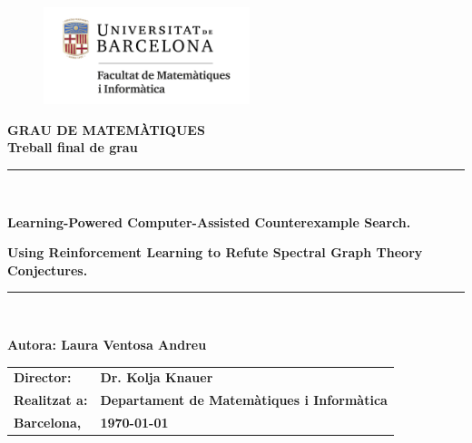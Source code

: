 \documentclass[11pt]{article}
\title{}
\author{}
\date{}
\theoremstyle{definition}
\begin{document}
\begin{titlepage}
\begin{center}
\begin{figure}[htb]
\begin{center}
\includegraphics[width=6cm]{matematiquesinformatica-pos-rgb.png}
\end{center}
\end{figure}
\vspace*{1cm}

\textbf{\LARGE GRAU DE MATEM\`{A}TIQUES } \\
\vspace*{.5cm}
\textbf{\LARGE Treball final de grau} \\
\vspace*{1.5cm}

\rule{16cm}{0.1mm} \\
\begin{Huge}
\textbf{Learning-Powered Computer-Assisted Counterexample Search.} \\
\end{Huge}
\vspace*{.5cm}
\begin{LARGE}
\textbf{Using Reinforcement Learning to Refute Spectral Graph Theory Conjectures.} \\
\end{LARGE}
\rule{16cm}{0.1mm} \\
\vspace{1cm}

\begin{flushright}
\textbf{\LARGE Autora: Laura Ventosa Andreu}
\vspace*{2cm}

\renewcommand{\arraystretch}{1.5}
\begin{tabular}{ll}
\textbf{\Large Director:} & \textbf{\Large Dr. Kolja Knauer} \\
\textbf{\Large Realitzat a:} & \textbf{\Large  Departament de Matem\`{a}tiques i Inform\`{a}tica} \\
\textbf{\Large Barcelona,} & \textbf{\Large \today }

\end{tabular}
\end{flushright}
\end{center}
\end{titlepage}
\end{document}
